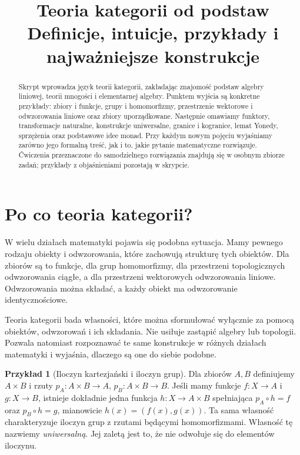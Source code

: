 \documentclass[11pt,a4paper]{article}
\title{\textbf{Teoria kategorii od podstaw}\\\large Definicje, intuicje, przykłady i najważniejsze konstrukcje}
\author{}
\date{}
\numberwithin{equation}{section}
\theoremstyle{plain}
\theoremstyle{definition}
\newtheorem{przyklad}[twierdzenie]{Przykład}
\theoremstyle{remark}
\begin{document}
\maketitle
\begin{abstract}
Skrypt wprowadza język teorii kategorii, zakładając znajomość podstaw algebry liniowej, teorii mnogości i elementarnej algebry. Punktem wyjścia są konkretne przykłady: zbiory i funkcje, grupy i homomorfizmy, przestrzenie wektorowe i odwzorowania liniowe oraz zbiory uporządkowane. Następnie omawiamy funktory, transformacje naturalne, konstrukcje uniwersalne, granice i kogranice, lemat Yonedy, sprzężenia oraz podstawowe idee monad. Przy każdym nowym pojęciu wyjaśniamy zarówno jego formalną treść, jak i to, jakie pytanie matematyczne rozwiązuje. Ćwiczenia przeznaczone do samodzielnego rozwiązania znajdują się w osobnym zbiorze zadań; przykłady z objaśnieniami pozostają w skrypcie.
\end{abstract}
\tableofcontents
\newpage

\section{Po co teoria kategorii?}\label{sec:motywacja}

W wielu działach matematyki pojawia się podobna sytuacja. Mamy pewnego rodzaju obiekty i odwzorowania, które zachowują strukturę tych obiektów. Dla zbiorów są to funkcje, dla grup homomorfizmy, dla przestrzeni topologicznych odwzorowania ciągłe, a dla przestrzeni wektorowych odwzorowania liniowe. Odwzorowania można składać, a każdy obiekt ma odwzorowanie identycznościowe.

Teoria kategorii bada własności, które można sformułować wyłącznie za pomocą obiektów, odwzorowań i ich składania. Nie usiłuje zastąpić algebry lub topologii. Pozwala natomiast rozpoznawać te same konstrukcje w różnych działach matematyki i wyjaśnia, dlaczego są one do siebie podobne.

\begin{przyklad}[Iloczyn kartezjański i iloczyn grup]
Dla zbiorów $A,B$ definiujemy $A\times B$ i rzuty $p_A:A\times B\to A$, $p_B:A\times B\to B$. Jeśli mamy funkcje $f:X\to A$ i $g:X\to B$, istnieje dokładnie jedna funkcja $h:X\to A\times B$ spełniająca $p_A\circ h=f$ oraz $p_B\circ h=g$, mianowicie $h(x)=(f(x),g(x))$. Ta sama własność charakteryzuje iloczyn grup z rzutami będącymi homomorfizmami. Własność tę nazwiemy \emph{uniwersalną}. Jej zaletą jest to, że nie odwołuje się do elementów iloczynu.
\end{przyklad}
\end{document}
